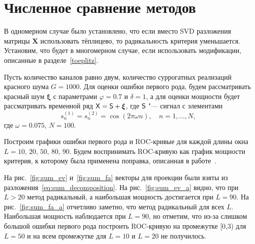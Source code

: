 \documentclass[specialist,
substylefile = spbu_report.rtx,
subf,href,colorlinks=true, 12pt]{disser}
\newcommand{\traj}{\mathbf{X}}
\theoremstyle{definition}
\newcommand{\bfxi}{\boldsymbol{\xi}}
\begin{document}
	\section{Численное сравнение методов}
	В одномерном случае было установлено, что если вместо SVD разложения матрицы $\traj$ использовать тёплицево, то радикальность критерия уменьшается. Установим, что будет в многомерном случае, если использовать модификации, описанные в разделе~\ref{toeplitz}.
	
	Пусть количество каналов равно двум, количество суррогатных реализаций красного шума $G=1000$. Для оценки ошибки первого рода, будем рассматривать красный шум $\bfxi$ с параметрами $\varphi=0.7$ и $\delta=1$, а для оценки мощности будет рассматривать временной ряд $\tX=\tS+\bfxi$, где $\mathsf{S}$ "--- сигнал с элементами
	\[
	s_n^{(1)}=s_n^{(2)}=\cos(2\pi\omega n),\quad n=1,\ldots, N,
	\]
	где $\omega=0.075$, $N=100$.
	
	Построим графики ошибки первого рода и ROC-кривые для каждой длины окна $L=10$, $20$, $50$, $80$, $90$. Будем воспринимать ROC-кривую как график мощности критерия, к которому была применена поправка, описанная в работе~\cite{Larin_2022}. 
	
	На рис.~\ref{fig:sum_ev} и~\ref{fig:sum_fa} векторы для проекции были взяты из разложения~\eqref{eq:sum_decomposition}. На рис.~\ref{fig:sum_ev_a} видно, что при $L>20$ метод радикальный, а наибольшая мощность достигается при $L=90$. На рис.~\ref{fig:sum_fa_a} отчетливо заметно, что метод радикальный для всех $L$. Наибольшая мощность наблюдается при $L=90$, но отметим, что из-за слишком большой ошибки первого рода построить ROC-кривую на промежутке [0,3) для $L=50$ и на всем промежутке для $L=10$ и $L=20$ не получилось.
	
\end{document}
